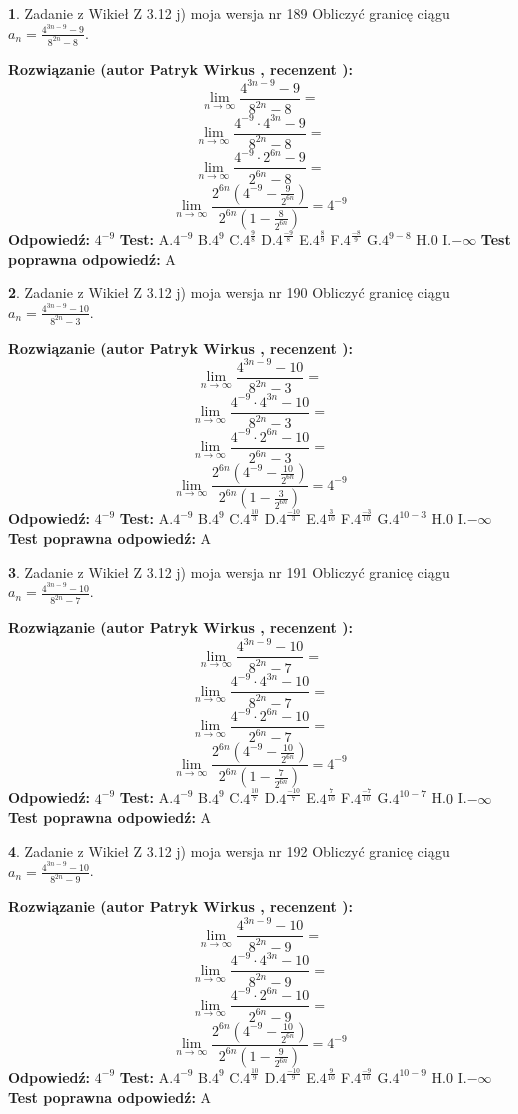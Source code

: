 \documentclass[12pt, a4paper]{article}
\theoremstyle{definition} %
\newtheorem{zad}{}
\newcommand{\zadStart}[1]{\begin{zad}#1\newline}
\newcommand{\zadStop}{\end{zad}}
\newcommand{\rozwStart}[2]{\noindent \textbf{Rozwiązanie (autor #1 , recenzent #2): }\newline}
\newcommand{\rozwStop}{\newline}
\newcommand{\odpStart}{\noindent \textbf{Odpowiedź:}\newline}
\newcommand{\odpStop}{\newline}
\newcommand{\testStart}{\noindent \textbf{Test:}\newline}
\newcommand{\testStop}{\newline}
\newcommand{\kluczStart}{\noindent \textbf{Test poprawna odpowiedź:}\newline}
\newcommand{\kluczStop}{\newline}
\begin{document}
\zadStart{Zadanie z Wikieł Z 3.12 j) moja wersja nr 189}
Obliczyć granicę ciągu $a_{n}=\frac{4^{3n-9}-9}{8^{2n}-8}$.
\zadStop
\rozwStart{Patryk Wirkus}{}
$$\lim\limits_{n\to\infty}\frac{4^{3n-9}-9}{8^{2n}-8}=$$
$$\lim\limits_{n\to\infty}\frac{4^{-9} \cdot 4^{3n}-9}{8^{2n}-8}=$$
$$\lim\limits_{n\to\infty}\frac{4^{-9} \cdot 2^{6n}-9}{2^{6n}-8}=$$
$$\lim\limits_{n\to\infty}\frac{2^{6n}(4^{-9} - \frac{9}{2^{6n}})}{2^{6n}(1-\frac{8}{2^{6n}})}= 4^{-9}$$
\rozwStop
\odpStart
$4^{-9}$
\odpStop
\testStart
A.$4^{-9}$
B.$4^{9}$
C.$4^{\frac{9}{8}}$
D.$4^{\frac{-9}{8}}$
E.$4^{\frac{8}{9}}$
F.$4^{\frac{-8}{9}}$
G.$4^{9-8}$
H.$0$
I.$-\infty$
\testStop
\kluczStart
A
\kluczStop



\zadStart{Zadanie z Wikieł Z 3.12 j) moja wersja nr 190}
Obliczyć granicę ciągu $a_{n}=\frac{4^{3n-9}-10}{8^{2n}-3}$.
\zadStop
\rozwStart{Patryk Wirkus}{}
$$\lim\limits_{n\to\infty}\frac{4^{3n-9}-10}{8^{2n}-3}=$$
$$\lim\limits_{n\to\infty}\frac{4^{-9} \cdot 4^{3n}-10}{8^{2n}-3}=$$
$$\lim\limits_{n\to\infty}\frac{4^{-9} \cdot 2^{6n}-10}{2^{6n}-3}=$$
$$\lim\limits_{n\to\infty}\frac{2^{6n}(4^{-9} - \frac{10}{2^{6n}})}{2^{6n}(1-\frac{3}{2^{6n}})}= 4^{-9}$$
\rozwStop
\odpStart
$4^{-9}$
\odpStop
\testStart
A.$4^{-9}$
B.$4^{9}$
C.$4^{\frac{10}{3}}$
D.$4^{\frac{-10}{3}}$
E.$4^{\frac{3}{10}}$
F.$4^{\frac{-3}{10}}$
G.$4^{10-3}$
H.$0$
I.$-\infty$
\testStop
\kluczStart
A
\kluczStop



\zadStart{Zadanie z Wikieł Z 3.12 j) moja wersja nr 191}
Obliczyć granicę ciągu $a_{n}=\frac{4^{3n-9}-10}{8^{2n}-7}$.
\zadStop
\rozwStart{Patryk Wirkus}{}
$$\lim\limits_{n\to\infty}\frac{4^{3n-9}-10}{8^{2n}-7}=$$
$$\lim\limits_{n\to\infty}\frac{4^{-9} \cdot 4^{3n}-10}{8^{2n}-7}=$$
$$\lim\limits_{n\to\infty}\frac{4^{-9} \cdot 2^{6n}-10}{2^{6n}-7}=$$
$$\lim\limits_{n\to\infty}\frac{2^{6n}(4^{-9} - \frac{10}{2^{6n}})}{2^{6n}(1-\frac{7}{2^{6n}})}= 4^{-9}$$
\rozwStop
\odpStart
$4^{-9}$
\odpStop
\testStart
A.$4^{-9}$
B.$4^{9}$
C.$4^{\frac{10}{7}}$
D.$4^{\frac{-10}{7}}$
E.$4^{\frac{7}{10}}$
F.$4^{\frac{-7}{10}}$
G.$4^{10-7}$
H.$0$
I.$-\infty$
\testStop
\kluczStart
A
\kluczStop



\zadStart{Zadanie z Wikieł Z 3.12 j) moja wersja nr 192}
Obliczyć granicę ciągu $a_{n}=\frac{4^{3n-9}-10}{8^{2n}-9}$.
\zadStop
\rozwStart{Patryk Wirkus}{}
$$\lim\limits_{n\to\infty}\frac{4^{3n-9}-10}{8^{2n}-9}=$$
$$\lim\limits_{n\to\infty}\frac{4^{-9} \cdot 4^{3n}-10}{8^{2n}-9}=$$
$$\lim\limits_{n\to\infty}\frac{4^{-9} \cdot 2^{6n}-10}{2^{6n}-9}=$$
$$\lim\limits_{n\to\infty}\frac{2^{6n}(4^{-9} - \frac{10}{2^{6n}})}{2^{6n}(1-\frac{9}{2^{6n}})}= 4^{-9}$$
\rozwStop
\odpStart
$4^{-9}$
\odpStop
\testStart
A.$4^{-9}$
B.$4^{9}$
C.$4^{\frac{10}{9}}$
D.$4^{\frac{-10}{9}}$
E.$4^{\frac{9}{10}}$
F.$4^{\frac{-9}{10}}$
G.$4^{10-9}$
H.$0$
I.$-\infty$
\testStop
\kluczStart
A
\kluczStop
\end{document}

